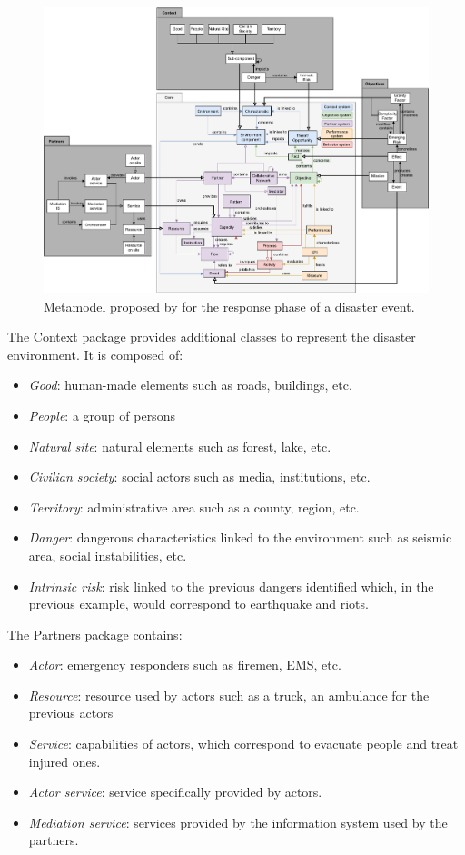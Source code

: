 \begin{figure}[htb]
    \centering
    \includegraphics[width=\textwidth]{figures/chap-3/benaben-metamodel-response.pdf}
    \caption{Metamodel proposed by \textcite{benabenMetamodelKnowledgeManagement2016} for the response phase of a disaster event.}
    \label{information:benaben-metamodel}
\end{figure}

The Context package provides additional classes to represent the disaster environment.
It is composed of:
\begin{itemize}
    \item \textit{Good}: human-made elements such as roads, buildings, etc.
    \item \textit{People}: a group of persons
    \item \textit{Natural site}: natural elements such as forest, lake, etc.
    \item \textit{Civilian society}: social actors such as media, institutions, etc.
    \item \textit{Territory}: administrative area such as a county, region, etc.
    \item \textit{Danger}: dangerous characteristics linked to the environment such as seismic area, social instabilities, etc.
    \item \textit{Intrinsic risk}: risk linked to the previous dangers identified which, in the previous example, would correspond to earthquake and riots.
\end{itemize}

The Partners package contains:
\begin{itemize}
    \item \textit{Actor}: emergency responders such as firemen, EMS, etc.
    \item \textit{Resource}: resource used by actors such as a truck, an ambulance for the previous actors
    \item \textit{Service}: capabilities of actors, which correspond to evacuate people and treat injured ones.
    \item \textit{Actor service}: service specifically provided by actors.
    \item \textit{Mediation service}: services provided by the information system used by the partners.
\end{itemize}

